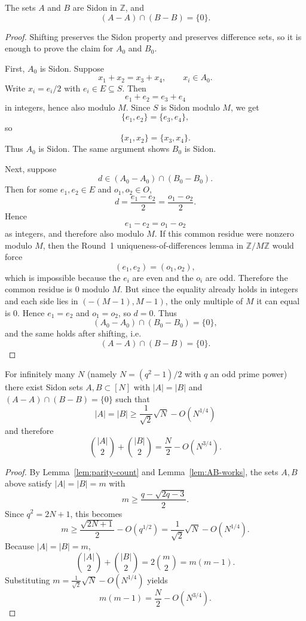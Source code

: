 \begin{lemma}\label{lem:AB-works}
The sets $A$ and $B$ are Sidon in $\mathbb Z$, and
\[
(A-A)\cap(B-B)=\{0\}.
\]
\end{lemma}

\begin{proof}
Shifting preserves the Sidon property and preserves difference sets, so it is enough to prove the claim for $A_0$ and $B_0$.

First, $A_0$ is Sidon.  Suppose
\[
x_1+x_2=x_3+x_4,\qquad x_i\in A_0.
\]
Write $x_i=e_i/2$ with $e_i\in E\subseteq S$.  Then
\[
e_1+e_2=e_3+e_4
\]
in integers, hence also modulo $M$.  Since $S$ is Sidon modulo $M$, we get
\[
\{e_1,e_2\}=\{e_3,e_4\},
\]
so
\[
\{x_1,x_2\}=\{x_3,x_4\}.
\]
Thus $A_0$ is Sidon.  The same argument shows $B_0$ is Sidon.

Next, suppose
\[
d\in(A_0-A_0)\cap(B_0-B_0).
\]
Then for some $e_1,e_2\in E$ and $o_1,o_2\in O$,
\[
d=\frac{e_1-e_2}{2}=\frac{o_1-o_2}{2}.
\]
Hence
\[
e_1-e_2=o_1-o_2
\]
as integers, and therefore also modulo $M$.
If this common residue were nonzero modulo $M$, then the Round~1 uniqueness-of-differences lemma in $\mathbb Z/M\mathbb Z$ would force
\[
(e_1,e_2)=(o_1,o_2),
\]
which is impossible because the $e_i$ are even and the $o_i$ are odd.
Therefore the common residue is $0$ modulo $M$.
But since the equality already holds in integers and each side lies in $(-(M-1),M-1)$, the only multiple of $M$ it can equal is $0$.  Hence $e_1=e_2$ and $o_1=o_2$, so $d=0$.
Thus
\[
(A_0-A_0)\cap(B_0-B_0)=\{0\},
\]
and the same holds after shifting, i.e.
\[
(A-A)\cap(B-B)=\{0\}.
\]
\end{proof}

\begin{theorem}\label{thm:lower}
For infinitely many $N$ (namely $N=(q^2-1)/2$ with $q$ an odd prime power) there exist Sidon sets $A,B\subset[N]$ with $|A|=|B|$ and $(A-A)\cap(B-B)=\{0\}$ such that
\[
|A|=|B|\ge \frac1{\sqrt2}\sqrt N-O(N^{1/4})
\]
and therefore
\[
\binom{|A|}{2}+\binom{|B|}{2}=\frac N2-O(N^{3/4}).
\]
\end{theorem}

\begin{proof}
By Lemma~\ref{lem:parity-count} and Lemma~\ref{lem:AB-works}, the sets $A,B$ above satisfy $|A|=|B|=m$ with
\[
m\ge \frac{q-\sqrt{2q-3}}{2}.
\]
Since $q^2=2N+1$, this becomes
\[
m\ge \frac{\sqrt{2N+1}}{2}-O(q^{1/2})
= \frac1{\sqrt2}\sqrt N-O(N^{1/4}).
\]
Because $|A|=|B|=m$,
\[
\binom{|A|}{2}+\binom{|B|}{2}=2\binom{m}{2}=m(m-1).
\]
Substituting $m=\frac1{\sqrt2}\sqrt N-O(N^{1/4})$ yields
\[
m(m-1)=\frac N2-O(N^{3/4}).
\]
\end{proof}


